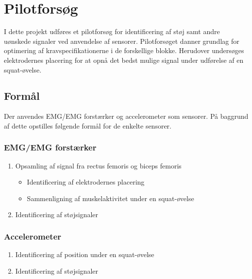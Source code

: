 \section{Pilotforsøg}
I dette projekt udføres et pilotforsøg for identificering af støj samt andre uønskede signaler ved anvendelse af sensorer. Pilotforsøget danner grundlag for optimering af kravspecifikationerne i de forskellige blokke. Herudover undersøges elektrodernes placering for at opnå det bedst mulige signal under udførelse af en squat-øvelse.

\subsection{Formål}
Der anvendes EMG/EMG forstærker og accelerometer som sensorer. På baggrund af dette opstilles følgende formål for de enkelte sensorer.  

\subsubsection{EMG/EMG forstærker}
\begin{enumerate}
\item Opsamling af signal fra rectus femoris og biceps femoris
\begin{itemize}
\item Identificering af elektrodernes placering
\item Sammenligning af muskelaktivitet under en squat-øvelse 
\end{itemize}
\item Identificering af støjsignaler
\end{enumerate}


\subsubsection{Accelerometer}
\begin{enumerate}
\item Identificering af position under en squat-øvelse
\item Identificering af støjsignaler
\end{enumerate}


